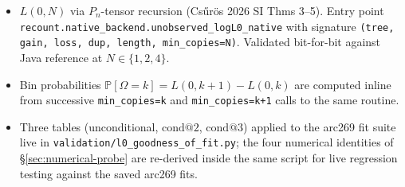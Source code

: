 \documentclass[11pt]{article}
\newcommand{\PROB}{\mathbb{P}}
\newcommand{\1}{\mathbf{1}}
\newcommand{\Om}{\Omega}
\theoremstyle{definition}
\begin{document}
\begin{itemize}[leftmargin=*]
\item $L(0, N)$ via $P_n$-tensor recursion (Cs\H{u}r\"os 2026 SI
  Thms 3--5). Entry point
  \texttt{recount.native\_backend.unobserved\_logL0\_native}
  with signature \texttt{(tree, gain, loss, dup, length, min\_copies=N)}.
  Validated bit-for-bit against Java reference at $N\in\{1,2,4\}$.
\item Bin probabilities $\PROB[\Om = k] = L(0, k+1) - L(0, k)$ are
  computed inline from successive \texttt{min\_copies=k} and
  \texttt{min\_copies=k+1} calls to the same routine.
\item Three tables (unconditional, $\mathrm{cond}@2$, $\mathrm{cond}@3$)
  applied to the arc269 fit suite live in
  \texttt{validation/l0\_goodness\_of\_fit.py}; the four numerical
  identities of \S\ref{sec:numerical-probe} are re-derived inside
  the same script for live regression testing against the saved
  arc269 fits.
\end{itemize}
\end{document}
